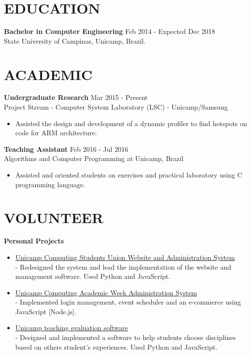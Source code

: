 \documentclass[margin, 10pt]{res} %
\begin{document}
\begin{resume}

\section{EDUCATION} 

{\bf Bachelor in Computer Engineering} \hfill Feb 2014 - Expected Dec 2018 \\
State University of Campinas, Unicamp, Brazil.
 
\section{ACADEMIC}

{\bf Undergraduate Research} \hfill Mar 2015 - Present \\
Project Stream - Computer System Laboratory (LSC) - Unicamp/Samsung \
\begin{itemize} \itemsep -1pt %
\item Assisted the design and development of a dynamic profiler to find hotspots on code for ARM architecture.
\end{itemize} 
{\bf Teaching Assistant} \hfill Feb 2016 - Jul 2016 \\
Algorithms and Computer Programming at Unicamp, Brazil \
\begin{itemize} \itemsep -1pt %
\item Assisted and oriented students on exercises and practical laboratory using C programming language.
\end{itemize}

\section{VOLUNTEER}

{\bf Personal Projects}
\begin{itemize} \itemsep -1pt %
\item \href{https://github.com/cacounicamp/Site}{Unicamp Computing Students Union Website and Administration System} \\
	 - Redesigned the system and lead the implementation of the website and management software. Used Python and JavaScript.
\item \href{https://github.com/henriquefacioli/secomp-painel}{Unicamp Computing Academic Week Administration System}\\
	 - Implemented login management, event scheduler and an e-commerce using JavaScript [Node.js].
\item \href{https://github.com/henriquefacioli/gd-ae-}{Unicamp teaching evaluation software}\\
	 - Designed and implemented a software to help students choose disciplines based on others student's experiences. Used Python and JavaScript.
\end{itemize}


\end{resume}
\end{document}
